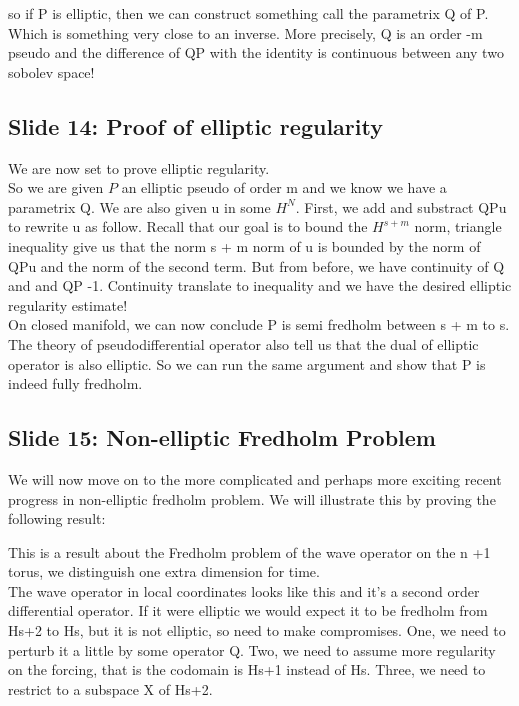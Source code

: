 \documentclass{article}
\begin{document}
so if P is elliptic, then we can construct something call the parametrix Q of P. Which is something very close to an inverse. More precisely, Q is an order -m pseudo and the difference of QP with the identity is continuous between any two sobolev space! 


\subsection{Slide 14: Proof of elliptic regularity}
We are now set to prove elliptic regularity. \\

So we are given $P$ an elliptic pseudo of order m and we know we have a parametrix Q. We are also given u in some $H^N$. First, we add and substract QPu to rewrite u as follow. Recall that our goal is to bound the $H^{s + m}$ norm, triangle inequality give us that the norm s + m norm of u is bounded by the norm of QPu and the norm of the second term. But from before, we have continuity of Q and and QP -1. Continuity translate to inequality and we have the desired elliptic regularity estimate! \\

On closed manifold, we can now conclude P is semi fredholm between s + m to s. 
The theory of pseudodifferential operator also tell us that the dual of elliptic operator is also elliptic. So we can run the same argument and show that P is indeed fully fredholm. 

\subsection{Slide 15: Non-elliptic Fredholm Problem}
We will now move on to the more complicated and perhaps more exciting recent progress in non-elliptic fredholm problem. We will illustrate this by proving the following result: 

This is a result about the Fredholm problem of the wave operator on the n +1 torus, we distinguish one extra dimension for time. \\
The wave operator in local coordinates looks like this and it's a second order differential operator. If it were elliptic we would expect it to be fredholm from Hs+2 to Hs, but it is not elliptic, so need to make compromises. 
One, we need to perturb it a little by some operator Q. 
Two, we need to assume more regularity on the forcing, that is the codomain is Hs+1 instead of Hs. 
Three, we need to restrict to a subspace X of Hs+2. 
\end{document}
